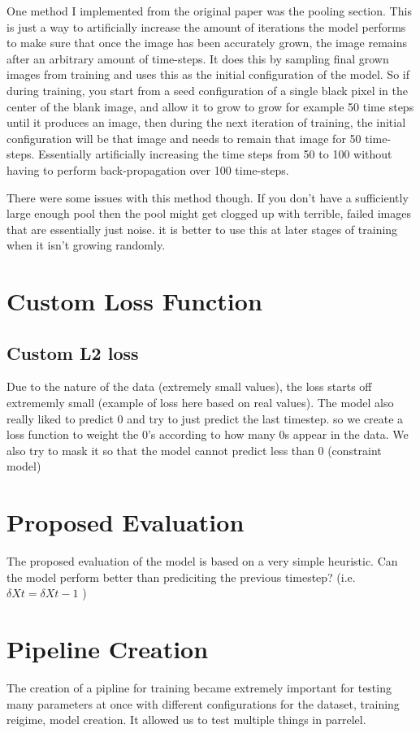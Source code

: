 One method I implemented from the original paper was the pooling section. This is just a way to artificially increase the amount of iterations the model performs to make sure that once the image has been accurately grown, the image remains after an arbitrary amount of time-steps. It does this by sampling final grown images from training and uses this as the initial configuration of the model. So if during training, you start from a seed configuration of a single black pixel in the center of the blank image, and allow it to grow to grow for example 50 time steps until it produces an image, then during the next iteration of training, the initial configuration will be that image and needs to remain that image for 50 time-steps. Essentially artificially increasing the time steps from 50 to 100 without having to perform back-propagation over 100 time-steps.

There were some issues with this method though. If you don't have a sufficiently large enough pool then the pool might get clogged up with terrible, failed images that are essentially just noise. it is better to use this at later stages of training when it isn't growing randomly.

\section{Custom Loss Function}
\subsection{Custom L2 loss}
Due to the nature of the data (extremely small values), the loss starts off extrememly small (example of loss here based on real values). The model also really liked to predict 0 and try to just predict the last timestep. so we create a loss function to weight the 0's according to how many 0s appear in the data. We also try to mask it so that the model cannot predict less than 0 (constraint model)
\section{Proposed Evaluation}
The proposed evaluation of the model is based on a very simple heuristic. Can the model perform better than prediciting the previous timestep? (i.e. $\delta{Xt} = \delta{Xt-1}$ )
\section{Pipeline Creation}
The creation of a pipline for training became extremely important for testing many parameters at once with different configurations for the dataset, training reigime, model creation. It allowed us to test multiple things in parrelel.